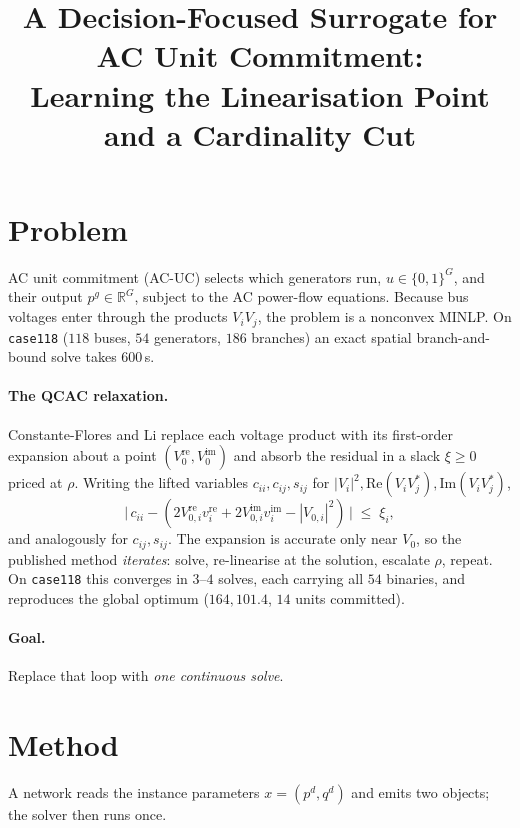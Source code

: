 \documentclass[11pt]{article}
\title{\vspace{-1.5em}A Decision-Focused Surrogate for AC Unit Commitment:\\
Learning the Linearisation Point and a Cardinality Cut}
\author{}
\date{}
\begin{document}
\maketitle\vspace{-3em}

\section{Problem}

AC unit commitment (AC-UC) selects which generators run, $u\in\{0,1\}^{G}$, and
their output $p^g\in\mathbb{R}^{G}$, subject to the AC power-flow equations.
Because bus voltages enter through the products $V_iV_j$, the problem is a
nonconvex MINLP. On \texttt{case118} ($118$ buses, $54$ generators, $186$
branches) an exact spatial branch-and-bound solve takes $600$\,s.

\paragraph{The QCAC relaxation.} Constante-Flores and Li replace each voltage
product with its first-order expansion about a point $(V^{\mathrm{re}}_0,
V^{\mathrm{im}}_0)$ and absorb the residual in a slack $\xi\ge 0$ priced at
$\rho$. Writing the lifted variables $c_{ii}, c_{ij}, s_{ij}$ for
$|V_i|^2, \mathrm{Re}(V_iV_j^*), \mathrm{Im}(V_iV_j^*)$,
\begin{equation}
\bigl|\,c_{ii} - (2V^{\mathrm{re}}_{0,i}v^{\mathrm{re}}_i
+ 2V^{\mathrm{im}}_{0,i}v^{\mathrm{im}}_i - |V_{0,i}|^2)\,\bigr| \;\le\; \xi_i ,
\label{eq:lin}
\end{equation}
and analogously for $c_{ij},s_{ij}$. The expansion is accurate only near
$V_0$, so the published method \emph{iterates}: solve, re-linearise at the
solution, escalate $\rho$, repeat. On \texttt{case118} this converges in $3$--$4$
solves, each carrying all $54$ binaries, and reproduces the global optimum
($164{,}101.4$, $14$ units committed).

\paragraph{Goal.} Replace that loop with \emph{one continuous solve}.

\section{Method}

A network reads the instance parameters $x=(p^d,q^d)$ and emits two objects;
the solver then runs once.
\end{document}
